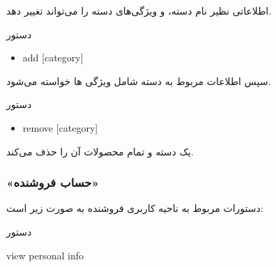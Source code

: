 \documentclass[]{article}
\begin{document}
اطلاعاتی نظیر نام دسته، و ویژگی‌های دسته را می‌تواند تغییر دهد.


\begin{mybox}[colback=brilliantlavender]{دستور}

\begin{latin}

\begin{itemize}[label = {$\Rightarrow$}]

\item
add [category]

\end{itemize}

\end{latin}

\end{mybox}

سپس اطلاعات مربوط به دسته شامل ویژگی ها خواسته می‌شود.

\begin{mybox}[colback=brilliantlavender]{دستور}

\begin{latin}

\begin{itemize}[label = {$\Rightarrow$}]

\item
remove [category]

\end{itemize}

\end{latin}

\end{mybox}

یک دسته و تمام محصولات آن را حذف می‌کند.

\newpage


\subsubsection*{{\titr «حساب فروشنده»}}

دستورات مربوط به ناحیه کاربری فروشنده به صورت زیر است:

\begin{mybox}[colback=yellow]{دستور}

\begin{latin}

view personal info

\end{latin}

\end{mybox}
\end{document}
